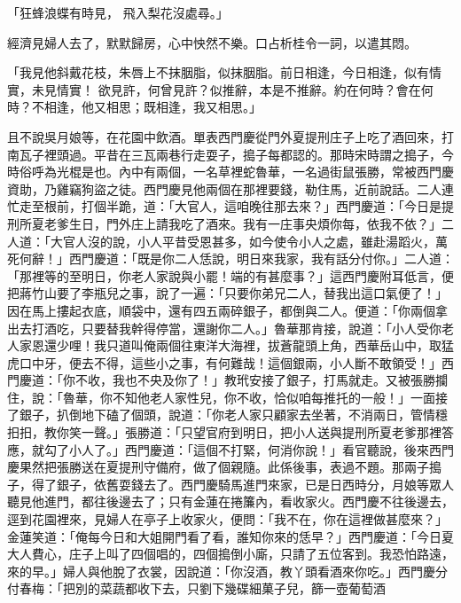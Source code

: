 「狂蜂浪蝶有時見，  飛入梨花沒處尋。」

經濟見婦人去了，默默歸房，心中怏然不樂。口占析桂令一詞，以遣其悶。

「我見他斜戴花枝，朱唇上不抹胭脂，似抹胭脂。前日相逢，今日相逢，似有情實，未見情實！  欲見許，何曾見許？似推辭，本是不推辭。約在何時？會在何時？不相逢，他又相思；既相逢，我又相思。」

且不說吳月娘等，在花園中飲酒。單表西門慶從門外夏提刑庄子上吃了酒回來，打南瓦子裡頭過。平昔在三瓦兩巷行走耍子，搗子每都認的。那時宋時謂之搗子，今時俗呼為光棍是也。內中有兩個，一名草裡蛇魯華，一名過街鼠張勝，常被西門慶資助，乃雞竊狗盜之徒。西門慶見他兩個在那裡要錢，勒住馬，近前說話。二人連忙走至根前，打個半跪，道：「大官人，這咱晚往那去來？」西門慶道：「今日是提刑所夏老爹生日，門外庄上請我吃了酒來。我有一庄事央煩你每，依我不依？」二人道：「大官人沒的說，小人平昔受恩甚多，如今使令小人之處，雖赴湯蹈火，萬死何辭！」西門慶道：「既是你二人恁說，明日來我家，我有話分付你。」二人道：「那裡等的至明日，你老人家說與小罷！端的有甚麼事？」這西門慶附耳低言，便把蔣竹山要了李瓶兒之事，說了一遍：「只要你弟兄二人，替我出這口氣便了！」因在馬上摟起衣底，順袋中，還有四五兩碎銀子，都倒與二人。便道：「你兩個拿出去打酒吃，只要替我幹得停當，還謝你二人。」魯華那肯接，說道：「小人受你老人家恩還少哩！我只道叫俺兩個往東洋大海裡，拔蒼龍頭上角，西華岳山中，取猛虎口中牙，便去不得，這些小之事，有何難哉！這個銀兩，小人斷不敢領受！」西門慶道：「你不收，我也不央及你了！」教玳安接了銀子，打馬就走。又被張勝攔住，說：「魯華，你不知他老人家性兒，你不收，恰似咱每推托的一般！」一面接了銀子，扒倒地下磕了個頭，說道：「你老人家只顧家去坐著，不消兩日，管情穩抇抇，教你笑一聲。」張勝道：「只望官府到明日，把小人送與提刑所夏老爹那裡答應，就勾了小人了。」西門慶道：「這個不打緊，何消你說！」看官聽說，後來西門慶果然把張勝送在夏提刑守備府，做了個親隨。此係後事，表過不題。那兩子搗子，得了銀子，依舊耍錢去了。西門慶騎馬進門來家，已是日西時分，月娘等眾人聽見他進門，都往後邊去了；只有金蓮在捲簾內，看收家火。西門慶不往後邊去，逕到花園裡來，見婦人在亭子上收家火，便問：「我不在，你在這裡做甚麼來？」金蓮笑道：「俺每今日和大姐開門看了看，誰知你來的恁早？」西門慶道：「今日夏大人費心，庄子上叫了四個唱的，四個搗倒小廝，只請了五位客到。我恐怕路遠，來的早。」婦人與他脫了衣裳，因說道：「你沒酒，教丫頭看酒來你吃。」西門慶分付春梅：「把別的菜蔬都收下去，只劉下幾碟細菓子兒，篩一壺葡萄酒 